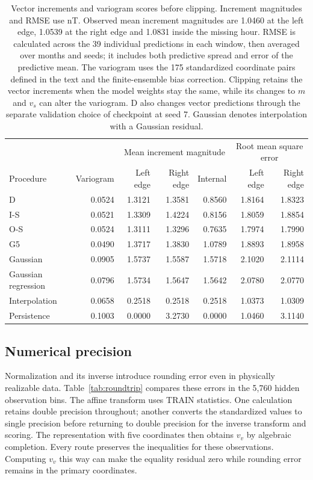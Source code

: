 \documentclass{article}
\begin{document}
\begin{table}[ht]
\centering
\caption{Vector increments and variogram scores before clipping. Increment magnitudes and RMSE use nT. Observed mean increment magnitudes are 1.0460 at the left edge, 1.0539 at the right edge and 1.0831 inside the missing hour. RMSE is calculated across the 39 individual predictions in each window, then averaged over months and seeds; it includes both predictive spread and error of the predictive mean. The variogram uses the 175 standardized coordinate pairs defined in the text and the finite-ensemble bias correction. Clipping retains the vector increments when the model weights stay the same, while its changes to $m$ and $v_s$ can alter the variogram. D also changes vector predictions through the separate validation choice of checkpoint at seed 7. Gaussian denotes interpolation with a Gaussian residual.}
\label{tab:geometry}
\setlength{\tabcolsep}{5.5pt}
\begin{tabular}{lrrrrrr}
\toprule
 & & \multicolumn{3}{c}{Mean increment magnitude} & \multicolumn{2}{c}{Root mean square error} \\
Procedure & Variogram & Left edge & Right edge & Internal & Left edge & Right edge \\
\midrule
D & 0.0524 & 1.3121 & 1.3581 & 0.8560 & 1.8164 & 1.8323 \\
I-S & 0.0521 & 1.3309 & 1.4224 & 0.8156 & 1.8059 & 1.8854 \\
O-S & 0.0524 & 1.3111 & 1.3296 & 0.7635 & 1.7974 & 1.7990 \\
G5 & 0.0490 & 1.3717 & 1.3830 & 1.0789 & 1.8893 & 1.8958 \\
Gaussian & 0.0905 & 1.5737 & 1.5587 & 1.5718 & 2.1020 & 2.1114 \\
Gaussian regression & 0.0796 & 1.5734 & 1.5647 & 1.5642 & 2.0780 & 2.0770 \\
Interpolation & 0.0658 & 0.2518 & 0.2518 & 0.2518 & 1.0373 & 1.0309 \\
Persistence & 0.1003 & 0.0000 & 3.2730 & 0.0000 & 1.0460 & 3.1140 \\
\bottomrule
\end{tabular}
\end{table}

\subsection{Numerical precision}
\label{app:numerics}

Normalization and its inverse introduce rounding error even in physically realizable data. Table~\ref{tab:roundtrip} compares these errors in the 5{,}760 hidden observation bins. The affine transform uses TRAIN statistics. One calculation retains double precision throughout; another converts the standardized values to single precision before returning to double precision for the inverse transform and scoring. The representation with five coordinates then obtains $v_v$ by algebraic completion. Every route preserves the inequalities for these observations. Computing $v_v$ this way can make the equality residual zero while rounding error remains in the primary coordinates.
\end{document}
